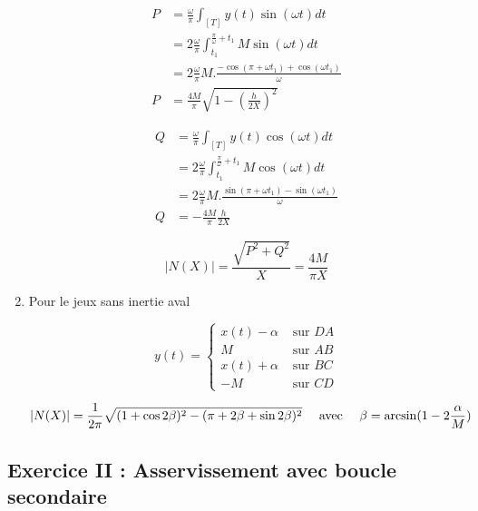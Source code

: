 \documentclass{../../td}{subfiles}
\begin{document}
\begin{enumerate}
\begin{multicols}{2}
\begin{align*}
P & = \frac{\omega}{\pi} \int_{[T]} y(t) \sin(\omega t) dt \\
& = 2\frac{\omega}{\pi} \int_{t_1}^{\frac{\pi}{\omega}+t_1} M \sin(\omega t) dt\\
& = 2\frac{\omega}{\pi}M . \frac{-\cos(\pi+\omega t_1) + \cos(\omega t_1)}{\omega} \\ 
P & = \frac{4M}{\pi} \sqrt{1-(\frac{h}{2X})^2}
\end{align*}

\begin{align*}
Q & = \frac{\omega}{\pi} \int_{[T]} y(t) \cos(\omega t) dt \\
& = 2\frac{\omega}{\pi} \int_{t_1}^{\frac{\pi}{\omega}+t_1} M \cos(\omega t) dt \\
& = 2\frac{\omega}{\pi}M.\frac{\sin(\pi + \omega t_1) - \sin(\omega t_1)}{\omega} \\
Q & = -\frac{4M}{\pi} \frac{h}{2X}
\end{align*}
\end{multicols}

\[ |N(X)| = \frac{\sqrt{P^2 + Q^2}}{X} = \frac{4M}{\pi X} \]

\item Pour le jeux sans inertie aval

\[ y(t) = 
\left\{
\begin{array}{cc}
x(t) - \alpha & \text{ sur } DA\\
M & \text{ sur } AB \\
x(t) + \alpha & \text{ sur } BC \\
-M & \text{ sur } CD
\end{array}
\right.
\]

\[ |N(X)| = \frac{1}{2\pi}\sqrt{ (1+\cos2\beta)^2 - (\pi+2\beta+\sin2\beta)^2} \quad\text{ avec }\quad \beta = \arcsin(1-2\frac{\alpha}{M}) \]

\end{enumerate}

\subsection*{Exercice II : Asservissement avec boucle secondaire}
\end{document}
